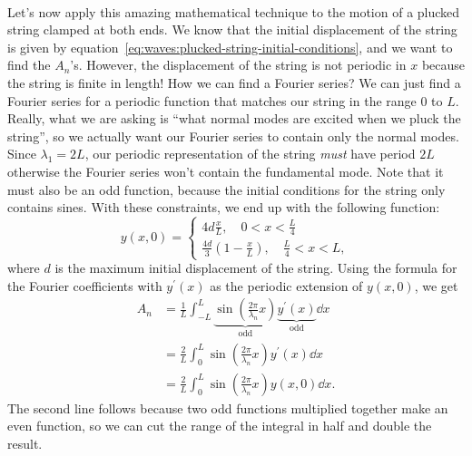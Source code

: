 \documentclass[../classical_mechanics.tex]{subfiles}
\begin{document}
        \paragraph{}
        Let's now apply this amazing mathematical technique to the motion of a plucked string clamped at both ends.
        We know that the initial displacement of the string is given by equation~\ref{eq:waves:plucked-string-initial-conditions}, and we want to find the $A_n$'s.
        However, the displacement of the string is not periodic in $x$ because the string is finite in length!
        How we can find a Fourier series?
        We can just find a Fourier series for a periodic function that matches our string in the range $0$ to $L$.
        Really, what we are asking is ``what normal modes are excited when we pluck the string'', so we actually want our Fourier series to contain only the normal modes.
        Since $\lambda_1=2L$, our periodic representation of the string \textit{must} have period $2L$ otherwise the Fourier series won't contain the fundamental mode.
        Note that it must also be an odd function, because the initial conditions for the string only contains sines.
        With these constraints, we end up with the following function:
        \begin{equation}
            y(x,0)=\begin{cases}
                4d\frac{x}{L},\quad 0<x<\frac{L}{4}\\
                \frac{4d}{3}\left(1-\frac{x}{L}\right),\quad\frac{L}{4}<x<L,
            \end{cases}
        \end{equation}
        where $d$ is the maximum initial displacement of the string.
        Using the formula for the Fourier coefficients with $y^\prime(x)$ as the periodic extension of $y(x,0)$, we get
        \begin{align}
            A_n&=\frac{1}{L}\int_{-L}^L\underbrace{\sin\left(\frac{2\pi}{\lambda_n}x\right)}_\text{odd}\underbrace{y^\prime(x)}_\text{odd}\dd{x}\\
            &=\frac{2}{L}\int_0^L\sin\left(\frac{2\pi}{\lambda_n}x\right)y^\prime(x)\dd{x}\\
            &=\frac{2}{L}\int_0^L\sin\left(\frac{2\pi}{\lambda_n}x\right)y(x,0)\dd{x}.
        \end{align}
        The second line follows because two odd functions multiplied together make an even function, so we can cut the range of the integral in half and double the result.
\end{document}
